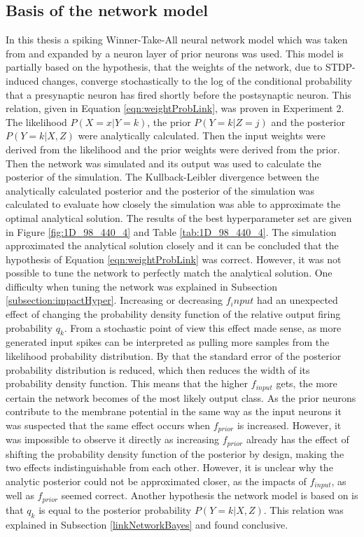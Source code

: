 \subsection{Basis of the network model}
\label{basisOfModel}
In this thesis a spiking Winner-Take-All neural network model which was taken from \citet{nessler} and expanded by a neuron layer of prior neurons was used. This model is partially based on the hypothesis, that the weights of the network, due to STDP-induced changes, converge stochastically to the log of the conditional probability that a presynaptic neuron has fired shortly before the postsynaptic neuron. This relation, given in Equation \ref{eqn:weightProbLink}, was proven in Experiment 2. The likelihood $P(X=x|Y=k)$, the prior $P(Y=k|Z=j)$ and the posterior $P(Y = k|X, Z)$ were analytically calculated. Then the input weights were derived from the likelihood and the prior weights were derived from the prior. Then the network was simulated and its output was used to calculate the posterior of the simulation. The Kullback-Leibler divergence between the analytically calculated posterior and the posterior of the simulation was calculated to evaluate how closely the simulation was able to approximate the optimal analytical solution. The results of the best hyperparameter set are given in Figure \ref{fig:1D_98_440_4} and Table \ref{tab:1D_98_440_4}. The simulation approximated the analytical solution closely and it can be concluded that the hypothesis of Equation \ref{eqn:weightProbLink} was correct. However, it was not possible to tune the network to perfectly match the analytical solution. One difficulty when tuning the network was explained in Subsection \ref{subsection:impactHyper}. Increasing or decreasing $f_input$ had an unexpected effect of changing the probability density function of the relative output firing probability $q_k$. From a stochastic point of view this effect made sense, as more generated input spikes can be interpreted as pulling more samples from the likelihood probability distribution. By that the standard error of the posterior probability distribution is reduced, which then reduces the width of its probability density function. This means that the higher $f_{input}$ gets,  the more certain the network becomes of the most likely output class. As the prior neurons contribute to the membrane potential in the same way as the input neurons it was suspected that the same effect occurs when $f_{prior}$ is increased. However, it was impossible to observe it directly as increasing $f_{prior}$ already has the effect of shifting the probability density function of the posterior by design, making the two effects indistinguishable from each other. However, it is unclear why the analytic posterior could not be approximated closer, as the impacts of $f_{input}$, as well as $f_{prior}$ seemed correct.
Another hypothesis the network model is based on is that $q_k$ is equal to the posterior probability $P(Y = k|X, Z)$. This relation was explained in Subsection \ref{linkNetworkBayes} and found conclusive.

